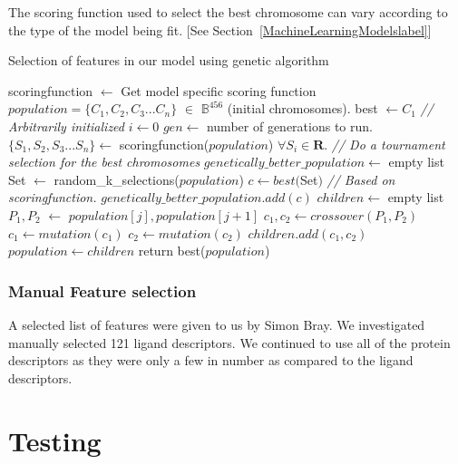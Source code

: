 \documentclass[11pt]{article}
\begin{document}
The scoring function used to select the best chromosome can vary according to the type of the model being fit. [See Section~\ref{MachineLearningModelslabel}]

\begin{algorithm}
\caption{Selection of features in our model using genetic algorithm \cite{genetic_algorithm}}
\label{alg:GeneticAlgo}
\begin{algorithmic}[1]
\State scoringfunction $\gets$ Get model specific scoring function
\State $ population = \{C_1, C_2, C_3... C_n\}$ $\in$ $\mathbb{B}^{456}$ (initial chromosomes).
\State best $\gets C_1$  \textit{// Arbitrarily initialized}
\State $i \gets 0$
\State $gen \gets$ number of generations to run.
          \State $\{S_1, S_2, S_3... S_n\} \gets$ scoringfunction($population$) $\forall S_i \in \mathbf{R}$.
          \State \textit{// Do a tournament selection for the best chromosomes}
          \State $genetically\_better\_population \gets$ empty list
              \State Set $\gets$ random\_k\_selections($population$)
              \State $c \gets best($Set$)$ \textit{// Based on scoringfunction.}
              \State $genetically\_better\_population.add(c)$
          \EndFor
          \State $children \gets$ empty list
              \State $P_1, P_2$ $\gets$ $population[j], population[j+1]$
              \State $c_1, c_2 \gets crossover(P_1, P_2)$
              \State $c_1 \gets mutation(c_1)$
              \State $c_2 \gets mutation(c_2)$
              \State $children.add(c_1, c_2)$
          \EndFor
          \State $population \gets children$
      \EndFor
\State return best($population$)
\EndProcedure
\end{algorithmic}
\end{algorithm}

\subsubsection{Manual Feature selection}
A selected list of features were given to us by Simon Bray. 
We investigated manually selected 121 ligand descriptors. 
We continued to use all of the protein descriptors as they were only a few in number as compared to the ligand descriptors.

\section{Testing}
\end{document}
